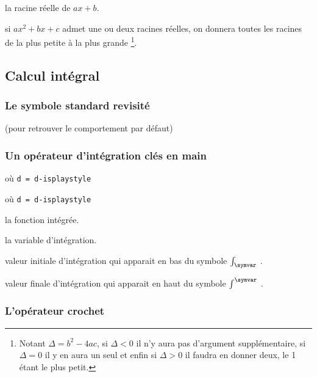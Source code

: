 \documentclass[12pt,a4paper]{article}
\theoremstyle{definition}
\newcommand\extraspace{
	\vspace{0.25em}
}
\newcommand\mwhyprefix[2]{%
	\texttt{#1 = #1-#2}%
}
\begin{document}
 la racine réelle de $ax + b$.


 si $ax^2 + bx + c$ admet une ou deux racines réelles, on donnera toutes les racines de la plus petite à la plus grande
\footnote{
	Notant $\Delta = b^2 - 4 ac$, si $\Delta < 0$ il n'y aura pas d'argument supplémentaire, si $\Delta = 0$ il y en aura un seul et enfin si $\Delta > 0$ il faudra en donner deux, le 1\ier{} étant le plus petit.
}.


\subsection{Calcul intégral}

\subsubsection{Le symbole standard revisité}



 (pour retrouver le comportement par défaut)




\subsubsection{Un opérateur d'intégration clés en main}





\extraspace

  où \quad \mwhyprefix{d}{isplaystyle}

  où \quad \mwhyprefix{d}{isplaystyle}


 la fonction intégrée.

 la variable d'intégration.

 valeur initiale d'intégration qui apparait en bas du symbole $\int_{\symvar}$ .

 valeur finale d'intégration qui apparait en haut du symbole $\int^{\symvar}$ .





\subsubsection{L'opérateur \og crochet \fg}
\end{document}
